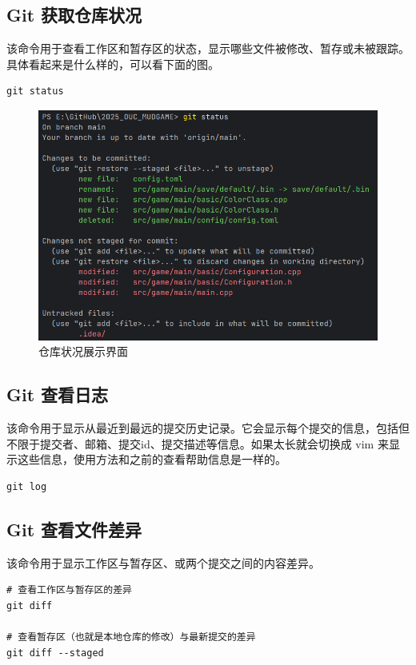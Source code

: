 \documentclass[UTF8]{gyh}
\begin{document}
    \subsection{Git 获取仓库状况}
    该命令用于查看工作区和暂存区的状态，显示哪些文件被修改、暂存或未被跟踪。具体看起来是什么样的，可以看下面的图。
    \begin{lstlisting}
git status
    \end{lstlisting}
    \begin{figure}[H]
        \centering
        \includegraphics[scale=0.5]{img/img2.png}
        \caption{仓库状况展示界面}
    \end{figure}


    \subsection{Git 查看日志}
    该命令用于显示从最近到最远的提交历史记录。它会显示每个提交的信息，包括但不限于提交者、邮箱、提交id、提交描述等信息。如果太长就会切换成 vim 来显示这些信息，使用方法和之前的查看帮助信息是一样的。
    \begin{lstlisting}
git log
    \end{lstlisting}

    \subsection{Git 查看文件差异}
    该命令用于显示工作区与暂存区、或两个提交之间的内容差异。
    \begin{lstlisting}
# 查看工作区与暂存区的差异
git diff

# 查看暂存区（也就是本地仓库的修改）与最新提交的差异
git diff --staged
    \end{lstlisting}
\end{document}
